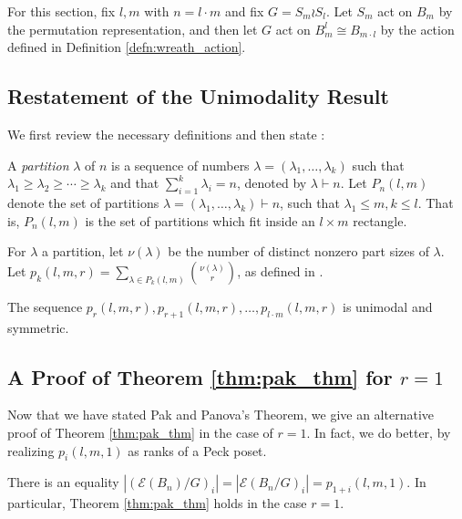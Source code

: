 \documentclass[smallextended, envcountsame, numbook]{svjour3}
\numberwithin{equation}{section}
\newcommand\ssec{\subsection}
\begin{document}
For this section, fix $l,m$ with $n = l \cdot m$ and fix $G = S_m \wr S_l$. Let $S_m$ act on $B_m$ by the permutation representation, and then let $G$ act on $B_{m}^l\cong B_{m \cdot l}$ by the action defined in Definition \ref{defn:wreath_action}.

\ssec{Restatement of the Unimodality Result}
We first review the necessary definitions and then state \cite[Theorem 1.1]{pak}:

A {\it partition} $\lambda$ of $n$ is a sequence of numbers $\lambda = (\lambda_1,\ldots, \lambda_k)$ such that $\lambda_1 \geq \lambda_2 \geq \cdots \geq \lambda_k$ and that $\sum_{i=1}^k \lambda_i = n$, denoted by  $\lambda \vdash n$. Let $P_n(l,m)$ denote the set of partitions $\lambda = (\lambda_1,\ldots, \lambda_k) \vdash n$, such that $\lambda_1 \leq m,k \leq l$. That is, $P_n(l,m)$ is the set of partitions which fit inside an $l \times m$ rectangle.

For $\lambda$ a partition, let $\nu(\lambda)$ be the number of distinct nonzero part sizes of $\lambda$.  Let $p_k(l,m,r) = \sum_{\lambda \in P_k(l,m)} \binom{\nu(\lambda)}{r}$, as defined in \cite[Section 1]{pak}.

\begin{theorem}
\label{thm:pak_thm}
\cite[Theorem 1.1]{pak}
The sequence $p_r(l,m,r), p_{r+1}(l,m,r),\ldots, p_{l\cdot m}(l,m,r)$ is unimodal and symmetric.
\end{theorem}

\ssec{A Proof of Theorem \ref{thm:pak_thm} for $r = 1$}
Now that we have stated Pak and Panova's Theorem, we give an alternative proof of Theorem \ref{thm:pak_thm} in the case of $r=1$. In fact, we do better, by realizing $p_i(l,m,1)$ as ranks of a Peck poset.

\begin{proposition}
\label{prop:rank_gen_fn_wreath_1}
There is an equality $|(\mathcal E(B_n)/G)_i| = |\mathcal E(B_n/G)_i| = p_{1+i}(l,m,1)$. In particular, Theorem \ref{thm:pak_thm} holds in the case $r = 1$.
\end{proposition}
\end{document}
